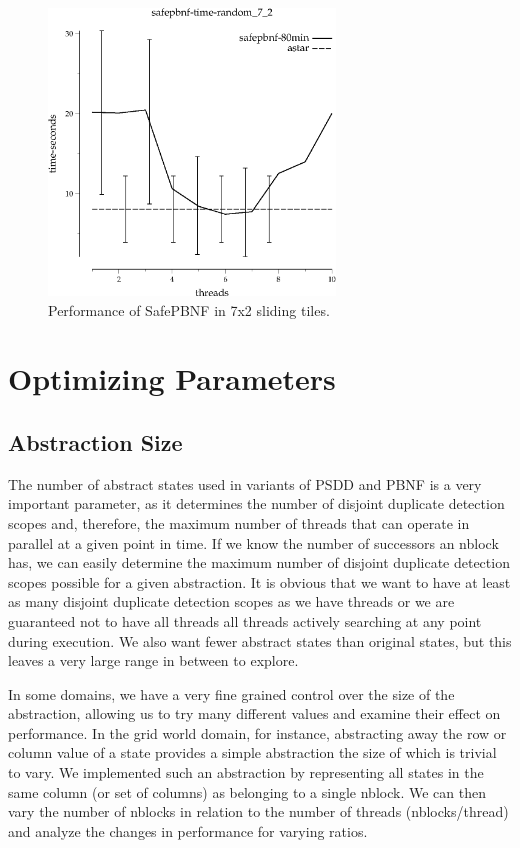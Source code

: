 \documentclass{article}
\begin{document}
\begin{figure}[h!]
\includegraphics[width=3in]{../graphs/seth/tiles-single/SAFEPBNF.eps}
\caption{Performance of SafePBNF in 7x2 sliding tiles.}
\label{fig:SafePBNF-life}
\end{figure}
\section{Optimizing Parameters}
\subsection{Abstraction Size}
The number of abstract states used in variants of PSDD and PBNF is a very important parameter, as it determines the number of disjoint duplicate detection scopes and, therefore, the maximum number of threads that can operate in parallel at a given point in time. If we know the number of successors an nblock has, we can easily determine the maximum number of disjoint duplicate detection scopes possible for a given abstraction. It is obvious that we want to have at least as many disjoint duplicate detection scopes as we have threads or we are guaranteed not to have all threads all threads actively searching at any point during execution. We also want fewer abstract states than original states, but this leaves a very large range in between to explore.

In some domains, we have a very fine grained control over the size of the abstraction, allowing us to try many different values and examine their effect on performance. In the grid world domain, for instance, abstracting away the row or column value of a state provides a simple abstraction the size of which is trivial to vary. We implemented such an abstraction by representing all states in the same column (or set of columns) as belonging to a single nblock. We can then vary the number of nblocks in relation to the number of threads (nblocks/thread) and analyze the changes in performance for varying ratios.
\end{document}
